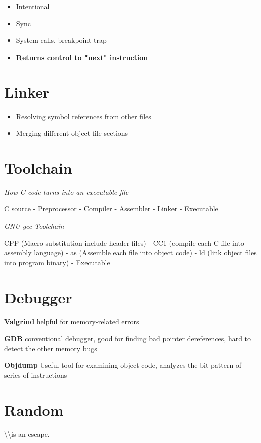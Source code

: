 \documentclass{article}
\begin{document}
\begin{itemize}
    \item Intentional
    \item Sync
    \item System calls, breakpoint trap
    \item \textbf{Returns control to "next" instruction}
\end{itemize}

\section{Linker}

\begin{itemize}
    \item Resolving symbol references from other files
    \item Merging different object file sections
\end{itemize}

\section{Toolchain}

\textit{How C code turns into an executable file}

C source - Preprocessor - Compiler - Assembler - Linker - Executable

\textit{GNU gcc Toolchain}

CPP (Macro substitution include header files) - CC1 (compile each C file into assembly language) - as (Assemble each file into object code) - ld (link object files into program binary) - Executable

\section{Debugger}

\textbf{Valgrind} helpful for memory-related errors

\textbf{GDB} conventional debugger, good for finding bad pointer dereferences, hard to detect the other memory bugs

\textbf{Objdump} Useful tool for examining object code, analyzes the bit pattern of series of instructions

\section{Random}

\textbackslash\textbackslash is an escape.
\end{document}
